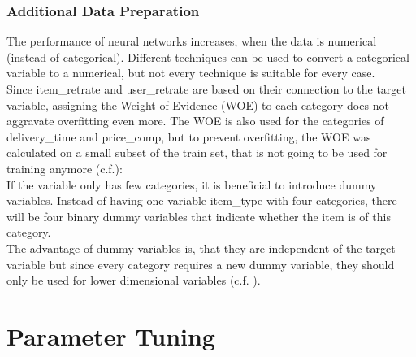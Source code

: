 \documentclass[a4paper,12pt]{article}
\begin{document}
\subsubsection{Additional Data Preparation}\label{Subsec::AddPrep}
The performance of neural networks increases, when the data is numerical (instead of categorical). Different techniques can be used to convert a categorical variable to a numerical, but not every technique is suitable for every case.\\
Since item\_retrate and user\_retrate are based on their connection to the target variable, assigning the Weight of Evidence (WOE) to each category does not aggravate overfitting even more. The WOE is also used for the categories of delivery\_time and price\_comp, but to prevent overfitting, the WOE was calculated on a small subset of the train set, that is not going to be used for training anymore (c.f.\cite{moeyersoms2015}):\\
If the variable only has few categories, it is beneficial to introduce dummy variables. Instead of having one variable item\_type with four categories, there will be four binary dummy variables that indicate whether the item is of this category. 
\\
The advantage of dummy variables is, that they are independent of the target variable but since every category requires a new dummy variable, they should only be used for lower dimensional variables (c.f. \cite{moeyersoms2015}).

\section{Parameter Tuning}\label{Sec::ParTun}
\end{document}
